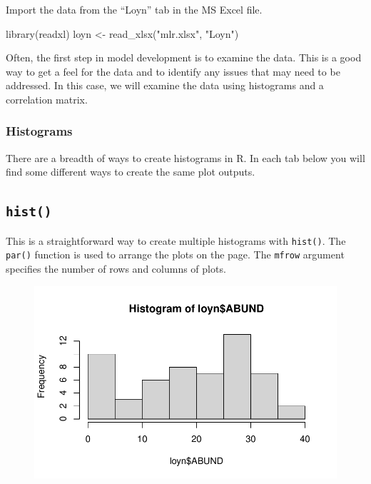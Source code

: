 \documentclass[
  10pt,
  letterpaper,
  DIV=11,
  numbers=noendperiod]{scrartcl}
\newenvironment{Shaded}{\begin{snugshade}}{\end{snugshade}}
\newcommand{\CommentTok}[1]{\textcolor[rgb]{0.37,0.37,0.37}{#1}}
\newcommand{\FunctionTok}[1]{\textcolor[rgb]{0.28,0.35,0.67}{#1}}
\newcommand{\NormalTok}[1]{\textcolor[rgb]{0.00,0.23,0.31}{#1}}
\newcommand{\OtherTok}[1]{\textcolor[rgb]{0.00,0.23,0.31}{#1}}
\newcommand{\SpecialCharTok}[1]{\textcolor[rgb]{0.37,0.37,0.37}{#1}}
\newcommand{\StringTok}[1]{\textcolor[rgb]{0.13,0.47,0.30}{#1}}
\begin{document}
Import the data from the ``Loyn'' tab in the MS Excel file.

\begin{Shaded}
\begin{Highlighting}[]
\FunctionTok{library}\NormalTok{(readxl)}
\NormalTok{loyn }\OtherTok{\textless{}{-}} \FunctionTok{read\_xlsx}\NormalTok{(}\StringTok{"mlr.xlsx"}\NormalTok{, }\StringTok{"Loyn"}\NormalTok{)}
\end{Highlighting}
\end{Shaded}

Often, the first step in model development is to examine the data. This
is a good way to get a feel for the data and to identify any issues that
may need to be addressed. In this case, we will examine the data using
histograms and a correlation matrix.

\hypertarget{histograms}{%
\subsubsection{Histograms}\label{histograms}}

There are a breadth of ways to create histograms in R. In each tab below
you will find some different ways to create the same plot outputs.

\subsection{\texorpdfstring{\texttt{hist()}}{hist()}}

This is a straightforward way to create multiple histograms with
\texttt{hist()}. The \texttt{par()} function is used to arrange the
plots on the page. The \texttt{mfrow} argument specifies the number of
rows and columns of plots.

\begin{Shaded}
\end{Shaded}

\begin{figure}[H]

{\centering \includegraphics{ENVX2001-2024-Lab07_files/figure-pdf/unnamed-chunk-2-1.pdf}

}

\end{figure}
\end{document}
